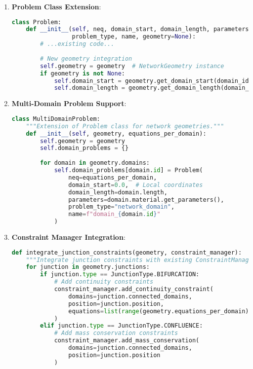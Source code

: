\begin{enumerate}
    \item \textbf{Problem Class Extension}:
    \begin{lstlisting}[language=Python, caption=Required Problem Class Integration]
class Problem:
    def __init__(self, neq, domain_start, domain_length, parameters, 
                 problem_type, name, geometry=None):
        # ...existing code...
        
        # New geometry integration
        self.geometry = geometry  # NetworkGeometry instance
        if geometry is not None:
            self.domain_start = geometry.get_domain_start(domain_id=0)
            self.domain_length = geometry.get_domain_length(domain_id=0)
    \end{lstlisting}
    
    \item \textbf{Multi-Domain Problem Support}:
    \begin{lstlisting}[language=Python, caption=Multi-Domain Problem Extension]
class MultiDomainProblem:
    """Extension of Problem class for network geometries."""
    def __init__(self, geometry, equations_per_domain):
        self.geometry = geometry
        self.domain_problems = {}
        
        for domain in geometry.domains:
            self.domain_problems[domain.id] = Problem(
                neq=equations_per_domain,
                domain_start=0.0,  # Local coordinates
                domain_length=domain.length,
                parameters=domain.material.get_parameters(),
                problem_type="network_domain",
                name=f"domain_{domain.id}"
            )
    \end{lstlisting}
    
    \item \textbf{Constraint Manager Integration}:
    \begin{lstlisting}[language=Python, caption=Junction Constraint Integration]
def integrate_junction_constraints(geometry, constraint_manager):
    """Integrate junction constraints with existing ConstraintManager."""
    for junction in geometry.junctions:
        if junction.type == JunctionType.BIFURCATION:
            # Add continuity constraints
            constraint_manager.add_continuity_constraint(
                domains=junction.connected_domains,
                position=junction.position,
                equations=list(range(geometry.equations_per_domain))
            )
        elif junction.type == JunctionType.CONFLUENCE:
            # Add mass conservation constraints
            constraint_manager.add_mass_conservation(
                domains=junction.connected_domains,
                position=junction.position
            )
    \end{lstlisting}
\end{enumerate}

